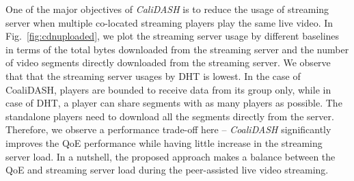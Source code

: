 One of the major objectives of \textit{CaliDASH} is to reduce the usage of streaming server when multiple co-located streaming players play the same live video. In Fig.~\ref{fig:cdnuploaded}, we plot the streaming server usage by different baselines in terms of the total bytes downloaded from the streaming server and the number of video segments directly downloaded from the streaming server. We observe that that the streaming server usages by DHT is lowest. In the case of CoaliDASH, players are bounded to receive data from its group only, while in case of DHT, a player can share segments with as many players as possible. The standalone players need to download all the segments directly from the server. Therefore, we observe a performance trade-off here -- \textit{CoaliDASH} significantly improves the QoE performance while having little increase in the streaming server load. In a nutshell, the proposed approach makes a balance between the QoE and streaming server load during the peer-assisted live video streaming.  


%
%
%





